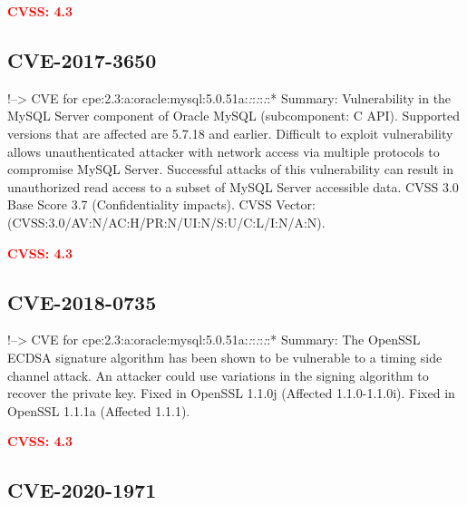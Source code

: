 \documentclass[a4paper, 12pt]{article}
\begin{document}
\textbf{\textcolor{red}{CVSS: 4.3}}

\hypertarget{cve-2017-3650}{%
\subsection{CVE-2017-3650}\label{cve-2017-3650}}

!--\textgreater{} CVE for
cpe:2.3:a:oracle:mysql:5.0.51a:\emph{:}:\emph{:}:\emph{:}:* Summary:
Vulnerability in the MySQL Server component of Oracle MySQL
(subcomponent: C API). Supported versions that are affected are 5.7.18
and earlier. Difficult to exploit vulnerability allows unauthenticated
attacker with network access via multiple protocols to compromise MySQL
Server. Successful attacks of this vulnerability can result in
unauthorized read access to a subset of MySQL Server accessible data.
CVSS 3.0 Base Score 3.7 (Confidentiality impacts). CVSS Vector:
(CVSS:3.0/AV:N/AC:H/PR:N/UI:N/S:U/C:L/I:N/A:N).

\textbf{\textcolor{red}{CVSS: 4.3}}

\hypertarget{cve-2018-0735}{%
\subsection{CVE-2018-0735}\label{cve-2018-0735}}

!--\textgreater{} CVE for
cpe:2.3:a:oracle:mysql:5.0.51a:\emph{:}:\emph{:}:\emph{:}:* Summary: The
OpenSSL ECDSA signature algorithm has been shown to be vulnerable to a
timing side channel attack. An attacker could use variations in the
signing algorithm to recover the private key. Fixed in OpenSSL 1.1.0j
(Affected 1.1.0-1.1.0i). Fixed in OpenSSL 1.1.1a (Affected 1.1.1).

\textbf{\textcolor{red}{CVSS: 4.3}}

\hypertarget{cve-2020-1971}{%
\subsection{CVE-2020-1971}\label{cve-2020-1971}}
\end{document}
